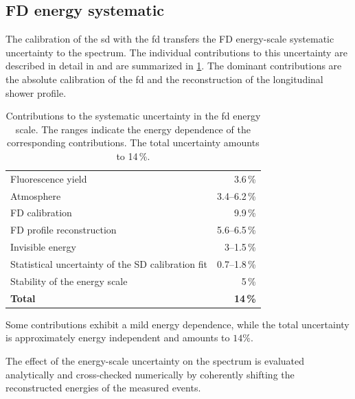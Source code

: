 \documentclass[main.tex]{subfiles}
\begin{document}
\subsection{FD energy systematic}

The calibration of the \gls{sd} with the \gls{fd} transfers the FD energy-scale systematic uncertainty to the  spectrum.
The individual contributions to this uncertainty are described in detail in \cite{PierreAuger:2015:Observatory} and are summarized in \cref{table:energy_scale_systematics}.
The dominant contributions are the absolute calibration of the \gls{fd} and the reconstruction of the longitudinal shower profile.

\begin{table}
    \centering
    \caption{Contributions to the systematic uncertainty in the \gls{fd} energy scale. The ranges indicate the energy dependence of the corresponding contributions. The total uncertainty amounts to 14\,\%.}
    \label{table:energy_scale_systematics}
    \begin{tabular}{lr}
        \hline
        Fluorescence yield
            & 3.6\,\% \\
        Atmosphere
            & 3.4--6.2\,\% \\
        FD calibration
            & 9.9\,\% \\
        FD profile reconstruction
            & 5.6--6.5\,\% \\
        Invisible energy
            & 3--1.5\,\% \\
        Statistical uncertainty of the SD calibration fit
            & 0.7--1.8\,\% \\
        Stability of the energy scale
            & 5\,\% \\
        \hline
        \textbf{Total}
            & \textbf{14\,\%} \\
        \hline
    \end{tabular}
\end{table}

Some contributions exhibit a mild energy dependence, while the total uncertainty is approximately energy independent and amounts to $14\%$.

The effect of the energy-scale uncertainty on the spectrum is evaluated analytically and cross-checked numerically by coherently shifting the reconstructed energies of the measured events.
\end{document}

